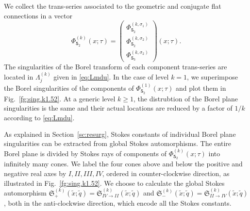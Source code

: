 \documentclass[a4paper,11pt]{article}	%
\def\md{\mathbf}
\def\mf{\mathfrak}
\def\tq{\tilde{q}}
\def\tx{\tilde{x}}
\newcommand{\s}{\sigma}
\newcommand{\knot}[1]{\md{#1}}
\begin{document}
We collect the trans-series associated to the geometric and conjugate
flat connections in a vector
\begin{equation}
  \Phi_{\knot{5}_2}^{(k)}(x;\tau) =
  \begin{pmatrix}
    \Phi_{\knot{5}_2}^{(k,\s_1)}\\
    \Phi_{\knot{5}_2}^{(k,\s_2)}\\
    \Phi_{\knot{5}_3}^{(k,\s_2)}
  \end{pmatrix}(x;\tau).
\end{equation}
The singularities of the Borel transform of each component
trans-series are located in $\Lambda^{(k)}_{j}$ given in
\eqref{eq:Lmdu}.  In the case of level $k=1$, we superimpose the Borel
singularities of the components of $\Phi_{\knot{5}_2}^{(1)}(x;\tau)$
and plot them in Fig.~\ref{fg:sing.k1.52}.  At a generic level
$k\geq 1$, the distrubtion of the Borel plane singularities is the
same and their actual locations are reduced by a factor of $1/k$
according to \eqref{eq:Lmdu}.

%
As explained in Section~\ref{sc:resurg}, Stokes constants of
individual Borel plane singularities can be extracted from global
Stokes automorphisms.
%
The entire Borel plane is divided by Stokes rays of components of
$\Phi_{\knot{5}_2}^{(k)}(x;\tau)$ into infinitely many cones.  We
label the four cones above and below the positive and negative real
axes by $I,II,III,IV$, ordered in counter-clockwise direction, as
illustrated in Fig.~\ref{fg:sing.k1.52}.  We choose to calculate the
global Stokes automorphism
$\mf{S}_+^{(k)}(\tx;\tq) = \mf{S}^{(k)}_{IV\rightarrow II}(\tx;\tq)$
and
$\mf{S}_-^{(k)}(\tx;\tq) = \mf{S}^{(k)}_{II \rightarrow IV}(\tx;\tq)$,
both in the anti-clockwise direction, which encode all the Stokes
constants.
\end{document}

